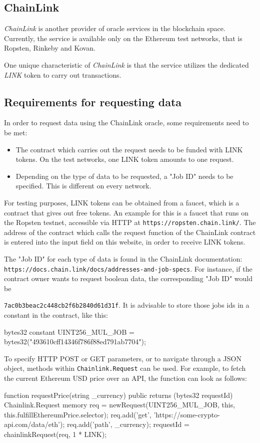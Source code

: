 \subsection{ChainLink}
\emph{ChainLink} is another provider of oracle services in the blockchain space. Currently, the service is available only on the Ethereum test networks, that is Ropsten, Rinkeby and Kovan.

One unique characteristic of \emph{ChainLink} is that the service utilizes the dedicated \emph{LINK} token to carry out transactions. 
\subsection*{Requirements for requesting data}
In order to request data using the ChainLink oracle, some requirements need to be met:
\begin{itemize}
	\item The contract which carries out the request needs to be funded with  LINK tokens. On the test networks, one LINK token amounts to one request.
	\item Depending on the type of data to be requested, a "Job ID" needs to be specified. This is different on every network.
\end{itemize}
For testing purposes, LINK tokens can be obtained from a faucet, which is a contract that gives out free tokens. An example for this is a faucet that runs on the Ropsten testnet, accessible via HTTP at \texttt{https://ropsten.chain.link/}. The address of the contract which calls the request function of the ChainLink contract is entered into the input field on this website, in order to receive LINK tokens.

The "Job ID" for each type of data is found in the ChainLink documentation: \texttt{https://docs.chain.link/docs/addresses-and-job-specs}. For instance, if the contract owner wants to request boolean data, the corresponding "Job ID" would be
 
\texttt{7ac0b3beac2c448cb2f6b2840d61d31f}. It is advisable to store those jobs ids in a constant in the contract, like this:

\begin{SolidityCode}
bytes32 constant UINT256_MUL_JOB = bytes32("493610cff14346f786f88ed791ab7704");
\end{SolidityCode}

To specify HTTP POST or GET parameters, or to navigate through a JSON object, methods within \texttt{Chainlink.Request} can be used. For example, to fetch the current Ethereum USD price over an API, the function can look as follows:
\begin{SolidityCode}
function requestPrice(string _currency) public returns (bytes32 requestId) {
	Chainlink.Request memory req =
	newRequest(UINT256_MUL_JOB, this, this.fulfillEthereumPrice.selector);
	req.add('get', 'https://some-crypto-api.com/data/eth');
	req.add('path', _currency);
	requestId = chainlinkRequest(req, 1 * LINK);
}
\end{SolidityCode}

